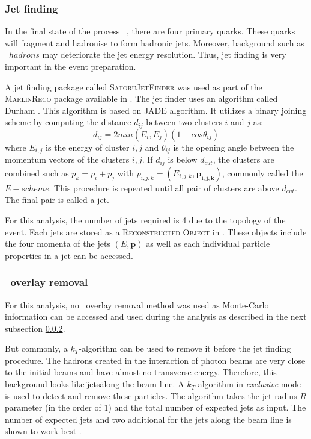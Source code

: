 \subsubsection{Jet finding}

In the final state of the process \ee \ra\ \WWqqqq{}, there are four primary quarks. These quarks will fragment and hadronise to form hadronic jets. Moreover, background such as \gam\gam \ra\ $hadrons$ may deteriorate the jet energy resolution. Thus, jet finding is very important in the event preparation.

A jet finding package called \textsc{SatoruJetFinder}\xspace was used as part of the \textsc{MarlinReco}\xspace package available in \ilcsoft. The jet finder uses an algorithm called Durham \cite{CATANI1991432, Moretti1998}. This algorithm is based on \textsc{JADE}\xspace algorithm. It utilizes a binary joining scheme by computing the distance $d_{ij}$ between two clusters $i$ and $j$ as:
\begin{equation}
  d_{ij} = 2min(E_i, E_j)(1 - cos\theta_{ij})
\end{equation}
where $E_{i,j}$ is the energy of cluster $i,j$ and $\theta_{ij}$ is the opening angle between the momentum vectors of the clusters $i,j$. If $d_{ij}$ is below $d_{cut}$, the clusters are combined such as $p_k = p_i + p_j$ with $p_{i,j,k} = (E_{i,j,k}, \mathbf{p_{i,j,k}})$, commonly called the $E-scheme$. This procedure is repeated until all pair of clusters are above $d_{cut}$. The final pair is called a jet.

For this analysis, the number of jets required is 4 due to the topology of the event. Each jets are stored as a \textsc{Reconstructed Object}\xspace in \lcio. These objects include the four momenta of the jets $(E, \mathbf{p})$ as well as each individual particle properties in a jet can be accessed.

\subsubsection{\gam\gam\ overlay removal}

For this analysis, no \gam\gam\ overlay removal method was used as Monte-Carlo information can be accessed and used during the analysis as described in the next subsection \ref{}.

But commonly, a $k_T$-algorithm can be used to remove it before the jet finding procedure. The hadrons created in the interaction of photon beams are very close to the initial beams and have almost no transverse energy. Therefore, this background looks like \"jets\" along the beam line. A $k_T$-algorithm in \textit{exclusive} mode is used to detect and remove these particles. The algorithm takes the jet radius $R$ parameter (in the order of 1) and the total number of expected jets as input. The number of expected jets and two additional for the jets along the beam line is shown to work best \cite{Mueller:301339}.

